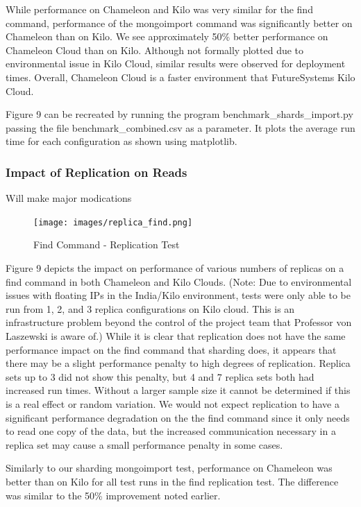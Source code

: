 \documentclass[9pt,twocolumn,twoside]{../../styles/osajnl}
\begin{document}
While performance on Chameleon and Kilo was very similar for the find command, performance of the mongoimport command was significantly better on Chameleon than on Kilo.  We see approximately 50\% better performance on Chameleon Cloud than on Kilo.  Although not formally plotted due to environmental issue in Kilo Cloud, similar results were observed for deployment times.  Overall, Chameleon Cloud is a faster environment that FutureSystems Kilo Cloud.

Figure 9 can be recreated by running the program benchmark\_shards\_import.py passing the file benchmark\_combined.csv as a parameter.  It plots the average run time for each configuration as shown using matplotlib.




\subsubsection{Impact of Replication on Reads}

Will make major modications

\begin{figure}[!ht]
  \texttt{[image: images/replica\_find.png]}
  \caption{Find Command - Replication Test}
\end{figure}


Figure 9 depicts the impact on performance of various numbers of replicas on a find command in both Chameleon and Kilo Clouds.  (Note: Due to environmental issues with floating IPs in the India/Kilo environment, tests were only able to be run from 1, 2, and 3 replica configurations on Kilo cloud.  This is an infrastructure problem beyond the control of the project team that Professor von Laszewski is aware of.)  While it is clear that replication does not have the same performance impact on the find command that sharding does, it appears that there may be a slight performance penalty to high degrees of replication.  Replica sets up to 3 did not show this penalty, but 4 and 7 replica sets both had increased run times.  Without a larger sample size it cannot be determined if this is a real effect or random variation.  We would not expect replication to have a significant performance degradation on the the find command since it only needs to read one copy of the data, but the increased communication necessary in a replica set may cause a small performance penalty in some cases.

Similarly to our sharding mongoimport test, performance on Chameleon was better than on Kilo for all test runs in the find replication test.  The difference was similar to the 50\% improvement noted earlier.
\end{document}
